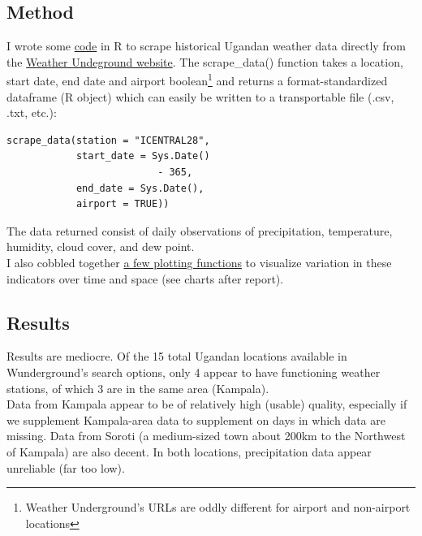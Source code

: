 \documentclass[11pt]{article}
\begin{document}
\begin{multicols}{2} 

\subsection*{Method}

\lettrine[nindent=0em,lines=3]{I}{} wrote some \href{https://github.com/joebrew/weather/tree/master/uganda}{code} in R to scrape historical Ugandan weather data directly from the \href{http://wunderground.com}{Weather Undeground website}. The scrape\_data() function takes a location, start date, end date and airport boolean\footnote{Weather Underground's URLs are oddly different for airport and non-airport locations} and returns a format-standardized dataframe (R object) which can easily be written to a transportable file (.csv, .txt, etc.): 
\begin{verbatim} 
scrape_data(station = "ICENTRAL28", 
            start_date = Sys.Date() 
                          - 365,
            end_date = Sys.Date(),
            airport = TRUE)) 
\end{verbatim} 

The data returned consist of daily observations of precipitation, temperature, humidity, cloud cover, and dew point.  \\

I also cobbled together \href{https://github.com/joebrew/weather/blob/master/uganda/visualization_functions.R}{a few plotting functions} to visualize variation in these indicators over time and space (see charts after report).

\subsection*{Results}
Results are mediocre.  Of the 15 total Ugandan locations available in Wunderground's search options, only 4 appear to have functioning weather stations, of which 3 are in the same area (Kampala). \\

Data from Kampala appear to be of relatively high (usable) quality, especially if we supplement Kampala-area data to supplement on days in which data are missing.  Data from Soroti (a medium-sized town about 200km to the Northwest of Kampala) are also decent.  In both locations, precipitation data appear unreliable (far too low).


\end{multicols}
\end{document}
